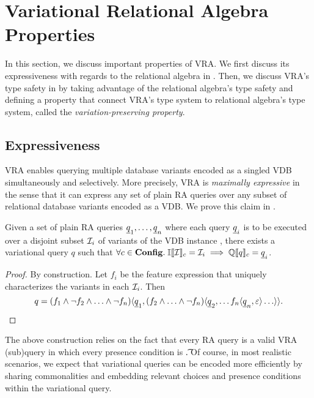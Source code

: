 \section{Variational Relational Algebra Properties}
\label{sec:vqlprop}


In this section, we discuss important properties of VRA. We first discuss its expressiveness
with regards to the relational algebra in .
Then, we discuss VRA's type safety in  by taking advantage of the
relational algebra's type safety and defining a property that connect VRA's type 
system to relational algebra's type system, called the \emph{variation-preserving property}.

\subsection{Expressiveness}
\label{sec:express}

VRA enables querying multiple database variants encoded as a singled VDB
simultaneously and selectively.
%
More precisely, VRA is \emph{maximally expressive} in the sense that it can
express any set of plain RA queries over any subset of relational database
variants encoded as a VDB. 
We prove this claim in .

\begin{theorem}
\label{thm:max-expr}
Given a set of plain RA queries $\pQ_1,\ldots,\pQ_n$ where each query $\pQ_i$
is to be executed over a disjoint subset $\vdbInst_i$ of variants of the VDB
instance \vdbInst, there exists a variational query $q$ such that
$\forall \config \in \confSet.\; \odbSem{\vdbInst} = \vdbInst_i \implies \eeSem{\vQ} = \pQ_i$.
\end{theorem}

\begin{proof}
By construction. Let $f_i$ be the feature expression that uniquely
characterizes the variants in each $\vdbInst_i$.
Then 
\[
\vQ =
\chc[(\fName_1\wedge\neg \fName_2\wedge\ldots\wedge\neg \fName_n)]{\pQ_1,
  \chc[(\fName_2\wedge\ldots\wedge\neg \fName_n)]{\pQ_2,\ldots
    \chc[\fName_n]{\pQ_n,\emp}\ldots}}.
\]
\end{proof}

\noindent
%
The above construction relies on the fact that every RA query is a valid VRA
(sub)query in which every presence condition is \t.
%
Of course, in most realistic scenarios, we expect that variational queries can be encoded
more efficiently by sharing commonalities and embedding relevant choices and
presence conditions within the variational query.







